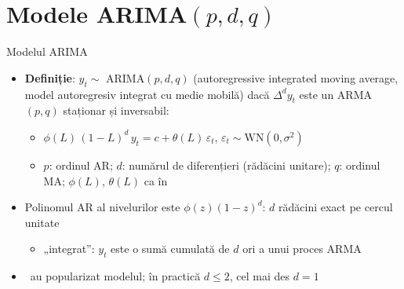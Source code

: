 \section{Modele ARIMA$(p,d,q)$}

\begin{frame}{Modelul ARIMA}
\itemsize{\small}
\begin{itemize}
    \item \textbf{Definiție}: $y_t \sim$ ARIMA$(p,d,q)$ (autoregressive integrated moving average, model autoregresiv integrat cu medie mobilă) dacă $\Delta^d y_t$ este un ARMA$(p,q)$ staționar și inversabil:
    \begin{itemize}
        \item $\phi(L)\,(1 - L)^d\,y_t = c + \theta(L)\,\varepsilon_t$, $\varepsilon_t \sim \mathrm{WN}(0, \sigma^2)$
        \item $p$: ordinul AR; $d$: numărul de diferențieri (rădăcini unitare); $q$: ordinul MA; $\phi(L)$, $\theta(L)$ ca în 
    \end{itemize}
    \item Polinomul AR al nivelurilor este $\phi(z)(1 - z)^d$: $d$ rădăcini exact pe cercul unitate
    \begin{itemize}
        \item „integrat”: $y_t$ este o sumă cumulată de $d$ ori a unui proces ARMA
    \end{itemize}
    \item {}\ au popularizat modelul; în practică $d \le 2$, cel mai des $d = 1$
\end{itemize}
\end{frame}

